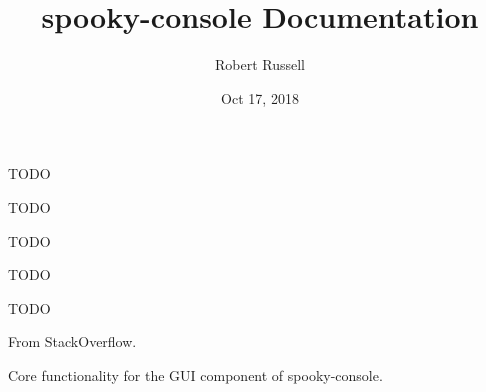 \documentclass[letterpaper,10pt,english]{sphinxmanual}
\title{spooky-console Documentation}
\date{Oct 17, 2018}
\author{Robert Russell}
\begin{document}
\pagestyle{empty}
\maketitle
\pagestyle{plain}
\sphinxtableofcontents
\pagestyle{normal}
\label{\detokenize{index::doc}}

\label{\detokenize{api:module-main}}
TODO

\label{\detokenize{api:module-exceptions}}
TODO

\begin{fulllineitems}
\label{\detokenize{api:exceptions.AbortPromptLoop}}
TODO

\end{fulllineitems}


\begin{fulllineitems}
\label{\detokenize{api:exceptions.TableFormatError}}
TODO

\end{fulllineitems}

\label{\detokenize{api:module-utils}}
TODO

\begin{fulllineitems}
\label{\detokenize{api:utils.find_nth}}
From StackOverflow.

\end{fulllineitems}

\label{\detokenize{api:module-gui.core}}
Core functionality for the GUI component of spooky-console.
\end{document}
